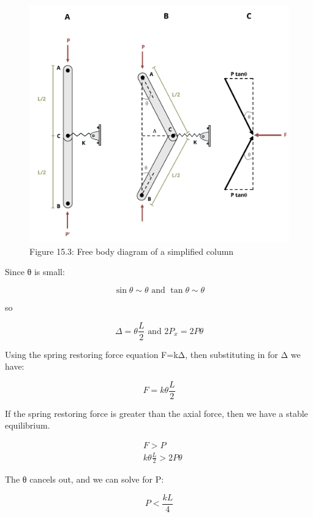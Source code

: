 \documentclass[
  letterpaper,
  DIV=11,
  numbers=noendperiod]{scrreprt}
\theoremstyle{definition}
\theoremstyle{remark}
\begin{document}
\begin{figure}[H]

{\centering \includegraphics{images/CH15s PNGs/figure 15.3.png}

}

\caption{Figure 15.3: Free body diagram of a simplified column}

\end{figure}%

Since θ is small:

\[
\sin \theta \sim \theta \text { and } \tan \theta \sim \theta
\]

so

\[
\Delta=\theta \frac{L}{2} \text { and } 2 P_x=2 P \theta
\]

Using the spring restoring force equation F=kΔ, then substituting in for
Δ we have:

\[
F=k \theta \frac{L}{2}
\]

If the spring restoring force is greater than the axial force, then we
have a stable equilibrium.

\[
\begin{aligned}
& F>P \\
& k \theta \frac{L}{2}>2 P \theta
\end{aligned}
\]

The θ cancels out, and we can solve for P:

\[
P<\frac{k L}{4}
\]
\end{document}
